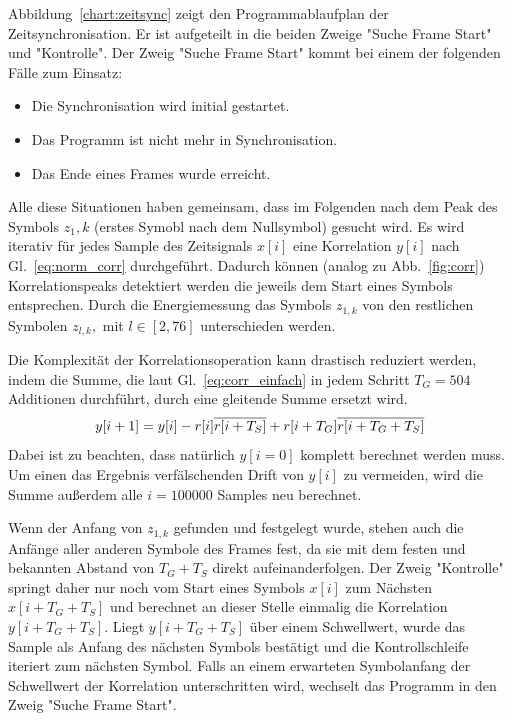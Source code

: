 Abbildung~\ref{chart:zeitsync} zeigt den Programmablaufplan der Zeitsynchronisation. Er ist aufgeteilt in die beiden Zweige "Suche Frame Start" und "Kontrolle". Der Zweig "Suche Frame Start" kommt bei einem der folgenden Fälle zum Einsatz:
\begin{itemize}
\item Die Synchronisation wird initial gestartet.
\item Das Programm ist nicht mehr in Synchronisation.
\item Das Ende eines Frames wurde erreicht.
\end{itemize}
Alle diese Situationen haben gemeinsam, dass im Folgenden nach dem Peak des Symbols $z_1,k$ (erstes Symobl nach dem Nullsymbol) gesucht wird. Es wird iterativ für jedes Sample des Zeitsignals $x[i]$ eine Korrelation $y[i]$ nach Gl.~\ref{eq:norm_corr} durchgeführt. Dadurch können (analog zu Abb.~\ref{fig:corr}) Korrelationspeaks detektiert werden die jeweils dem Start eines Symbols entsprechen. Durch die Energiemessung das Symbols $z_{1,k}$ von den restlichen Symbolen $z_{l,k},$ mit  $l \in [2,76]$ unterschieden werden.

Die Komplexität der Korrelationsoperation kann drastisch reduziert werden, indem die Summe, die laut Gl.~\ref{eq:corr_einfach} in jedem Schritt $T_G = 504$ Additionen durchführt, durch eine gleitende Summe ersetzt wird.
\begin{equation}
    y[i+1] = y[i] - r[i] \overline{r[i+T_S]} + r[i+T_G] \overline{r[i+T_G+T_S]}
    \label{eq:moving_sum}
\end{equation}
Dabei ist zu beachten, dass natürlich $y[i=0]$ komplett berechnet werden muss. Um einen das Ergebnis verfälschenden Drift von $y[i]$ zu vermeiden, wird die Summe außerdem alle $i=100000$ Samples neu berechnet.

Wenn der Anfang von $z_{1,k}$ gefunden und festgelegt wurde, stehen auch die Anfänge aller anderen Symbole des Frames fest, da sie mit dem festen und bekannten Abstand von $T_G+T_S$ direkt aufeinanderfolgen. Der Zweig "Kontrolle" springt daher nur noch vom Start eines Symbols $x[i]$ zum Nächsten $x[i+T_G+T_S]$ und berechnet an dieser Stelle einmalig die Korrelation $y[i+T_G+T_S]$. Liegt $y[i+T_G+T_S]$ über einem Schwellwert, wurde das Sample als Anfang des nächsten Symbols bestätigt und die Kontrollschleife iteriert zum nächsten Symbol. Falls an einem erwarteten Symbolanfang der Schwellwert der Korrelation unterschritten wird, wechselt das Programm in den Zweig "Suche Frame Start".

